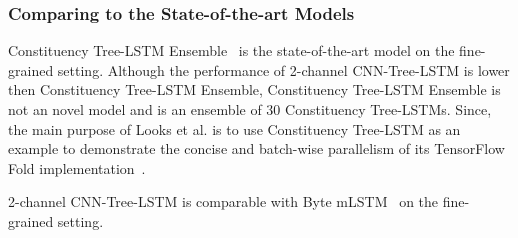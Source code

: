 \subsubsection{Comparing to the State-of-the-art Models}
Constituency Tree-LSTM Ensemble~\cite{LooksHHN17} is the state-of-the-art model on the fine-grained setting.
Although the performance of 2-channel CNN-Tree-LSTM is lower then Constituency Tree-LSTM Ensemble, Constituency Tree-LSTM Ensemble is not an novel model and is an ensemble of \(30\) Constituency Tree-LSTMs.
Since, the main purpose of Looks et al. is to use Constituency Tree-LSTM as an example to demonstrate the concise and batch-wise parallelism of its TensorFlow Fold implementation~\cite{LooksHHN17}.

2-channel CNN-Tree-LSTM is comparable with Byte mLSTM~\cite{mlstm} on the fine-grained setting.
